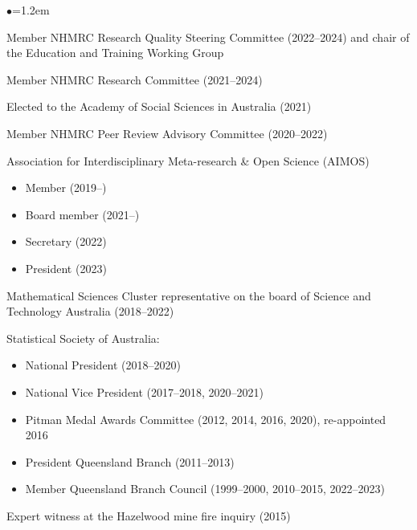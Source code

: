\documentclass[a4paper,11pt]{article}
\renewcommand{\labelitemi}{$\bullet$}
\renewcommand{\labelitemii}{$\star$}
\begin{document}
\begin{raggedright}
\begin{list}{\labelitemi}{\leftmargin=1.2em}\addtolength{\itemsep}{-0.4\baselineskip}
\item Member NHMRC Research Quality Steering Committee (2022--2024) and chair of the Education and Training Working Group 
\item Member NHMRC Research Committee (2021--2024)
\item Elected to the Academy of Social Sciences in Australia (2021)
\item Member NHMRC Peer Review Advisory Committee (2020--2022)
\item Association for Interdisciplinary Meta-research \& Open Science (AIMOS)
\begin{itemize}
\item Member (2019--)
\item Board member (2021--)
\item Secretary (2022)
\item President (2023)
\end{itemize}
\item Mathematical Sciences Cluster representative on the board of Science and Technology Australia (2018--2022)
\item Statistical Society of Australia:
\begin{itemize}
\item National President (2018--2020)
\item National Vice President (2017--2018, 2020--2021)
\item Pitman Medal Awards Committee (2012, 2014, 2016, 2020), re-appointed 2016
\item President Queensland Branch (2011--2013)
\item Member Queensland Branch Council (1999--2000, 2010--2015, 2022--2023)
\end{itemize}
\item Expert witness at the Hazelwood mine fire inquiry (2015)

\end{list}
\end{raggedright}
\end{document}
